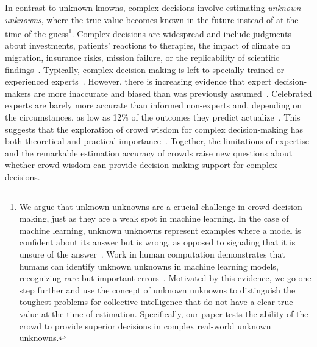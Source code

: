 \documentclass[sigconf]{acmart}
\begin{document}
In contrast to unknown knowns, complex decisions involve estimating \emph{unknown unknowns}, where the true value becomes known in the future instead of at the time of the guess\footnote{We argue that unknown unknowns are a crucial challenge in crowd decision-making, just as they are a weak spot in machine learning. In the case of machine learning, unknown unknowns represent examples where a model is confident about its answer but is wrong, as opposed to signaling that it is unsure of the answer~\cite{sharifi2022should,zhao2021exploratory,lakkaraju2017identifying}. Work in human computation demonstrates that humans can identify unknown unknowns in machine learning models, recognizing rare but important errors~\cite{attenberg2011beat}. Motivated by this evidence, we go one step further and use the concept of unknown unknowns to distinguish the toughest problems for collective intelligence that do not have a clear true value at the time of estimation. Specifically, our paper tests the ability of the crowd to provide superior decisions in complex real-world unknown unknowns.}. Complex decisions are widespread and include judgments about investments, patients’ reactions to therapies, the impact of climate on migration, insurance risks, mission failure, or the replicability of scientific findings~\cite{budescu2015identifying,chen2014wisdom,dreber2015using}. Typically, complex decision-making is left to specially trained or experienced experts~\cite{tetlock2017expert}. However, there is increasing evidence that expert decision-makers are more inaccurate and biased than was previously assumed~\cite{moore2017confidence,bonabeau2009decisions,tetlock2017expert}. Celebrated experts are barely more accurate than informed non-experts and, depending on the circumstances, as low as 12\% of the outcomes they predict actualize~\cite{tetlock2017expert,bonabeau2009decisions,moore2017confidence}. This suggests that the exploration of crowd wisdom for complex decision-making has both theoretical and practical importance~\cite{moore2017confidence}. Together, the limitations of expertise and the remarkable estimation accuracy of crowds raise new questions about whether crowd wisdom can provide decision-making support for complex decisions.  
\end{document}
